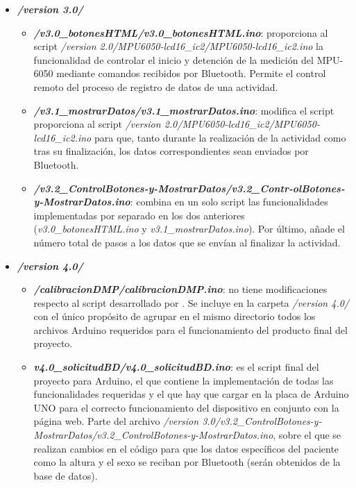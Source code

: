 \begin{itemize}
\begin{itemize}
\begin{itemize}
        \end{itemize}
        \item \textbf{\textit{/version 3.0/}}
        \begin{itemize}
            \item \textbf{\textit{/v3.0\_botonesHTML/v3.0\_botonesHTML.ino}}: proporciona al script \textit{/version 2.0/MPU6050-lcd16\_ic2/MPU6050-lcd16\_ic2.ino} la funcionalidad de controlar el inicio y detención de la medición del MPU-6050 mediante comandos recibidos por Bluetooth. Permite el control remoto del proceso de registro de datos de una actividad.
            \item \textbf{\textit{/v3.1\_mostrarDatos/v3.1\_mostrarDatos.ino}}: modifica el script proporciona al script \textit{/version 2.0/MPU6050-lcd16\_ic2/MPU6050-lcd16\_ic2.ino} para que, tanto durante la realización de la actividad como tras su finalización, los datos correspondientes sean enviados por Bluetooth.
            \item \textit{\textbf{/v3.2\_ControlBotones-y-MostrarDatos/v3.2\_Contr-olBotones-y-MostrarDatos.ino}}: combina en un solo script las funcionalidades implementadas por separado en los dos anteriores (\textit{v3.0\_botonesHTML.ino} y \textit{v3.1\_mostrarDatos.ino}). Por último, añade el número total de pasos a los datos que se envían al finalizar la actividad.
        \end{itemize}
        \item \textbf{\textit{/version 4.0/}}
        \begin{itemize}
            \item \textbf{\textit{/calibracionDMP/calibracionDMP.ino}}: no tiene modificaciones respecto al script desarrollado por \cite{saragonz91:online}. Se incluye en la carpeta \textit{/version 4.0/} con el único propósito de agrupar en el mismo directorio todos los archivos Arduino requeridos para el funcionamiento del producto final del proyecto.
            \item \textbf{\textit{v4.0\_solicitudBD/v4.0\_solicitudBD.ino}}: es el script final del proyecto para Arduino, el que contiene la implementación de todas las funcionalidades requeridas y el que hay que cargar en la placa de Arduino UNO para el correcto funcionamiento del dispositivo en conjunto con la página web. Parte del archivo \textit{/version 3.0/v3.2\_ControlBotones-y-MostrarDatos/v3.2\_ControlBotones-y-MostrarDatos.ino}, sobre el que se realizan cambios en el código para que los datos específicos del paciente como la altura y el sexo se reciban por Bluetooth (serán obtenidos de la base de datos).
        \end{itemize}
        

\end{itemize}
\end{itemize}
